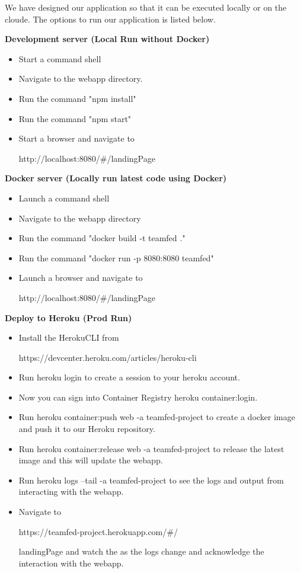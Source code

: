 \documentclass[sigconf,nonacm,11pt]{acmart}
\begin{document}
We have designed our application so that it can be executed locally or on the cloude.  The options to run our application is listed below.

\textbf{Development server (Local Run without Docker)}\\
\begin{itemize}
\item Start a command shell
\item Navigate to the webapp directory.
\item Run the command "npm install" 
\item Run the command "npm start"
\item Start a browser and navigate to

http://localhost:8080/\#/landingPage
\end{itemize}


\textbf{Docker server (Locally run latest code using Docker)}\\
\begin{itemize}
\item Launch a command shell
\item Navigate to the webapp directory
\item Run the command "docker build -t teamfed ."
\item Run the command "docker run -p 8080:8080 teamfed" 
\item  Launch a browser and navigate to 

http://localhost:8080/#/landingPage
\end{itemize}


\textbf{Deploy to Heroku (Prod Run)}\\
\begin{itemize}
\item Install the HerokuCLI from

https://devcenter.heroku.com/articles/heroku-cli
\item Run heroku login to create a session to your heroku account.
\item Now you can sign into Container Registry heroku container:login.
\item Run heroku container:push web -a teamfed-project to create a docker image and push it to our Heroku repository.
\item Run heroku container:release web -a teamfed-project to release the latest image and this will update the webapp.
\item Run heroku logs --tail -a teamfed-project to see the logs and output from interacting with the webapp.
\item Navigate to 

https://teamfed-project.herokuapp.com/#/

landingPage and watch the as the logs change and acknowledge the interaction with the webapp.
\end{itemize}
\end{document}
